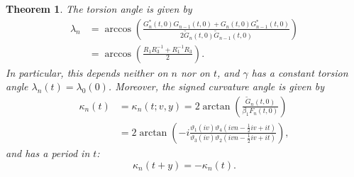 \documentclass[10pt,a4paper]{amsart}
\newtheorem{theorem}{Theorem}
\begin{document}
\begin{theorem}
The torsion angle is given by
\begin{equation}\label{lam2}
\begin{split}
\lambda_n&=\arccos\left(\frac{G_{n}^{*}(t, 0)G_{n-1}(t, 0)+G_{n}(t, 0)G_{n-1}^{*}(t, 0)}{2\widetilde{G}_{n}(t, 0)\widetilde{G}_{n-1}(t, 0)}\right)\\
&=\arccos\left(\frac{R_{1}R_{3}^{-1}+R_{1}^{-1}R_{3}}{2}\right).
\end{split}
\end{equation}
In particular, this depends neither on $n$ nor on $t$,
and $\gamma$ has a constant torsion angle
$\lambda_n(t)=\lambda_0(0)$.
Moreover,
the signed curvature angle is given by
\begin{equation}\label{kappa2}
\begin{split}
\kappa_{n}\left(t\right)&=\kappa_{n}\left(t;v,y\right)=2\arctan\left(\frac{\widetilde{G}_{n}(t, 0)}{\beta_{1} F_{n}(t, 0)}\right)\\
&=2\arctan\left(-i\frac{\vartheta_1(iv)\vartheta_4\left(ivn-\frac{1}{2}iv+it\right)}{\vartheta_3(iv)\vartheta_2\left(ivn-\frac{1}{2}iv+it\right)}\right),
\end{split}
\end{equation}
and has a period in $t$:
\begin{equation}\label{kappa_periodic}
    \kappa_{n}\left(t+y\right)=-\kappa_{n}\left(t\right).
\end{equation}
\end{theorem}
\end{document}

